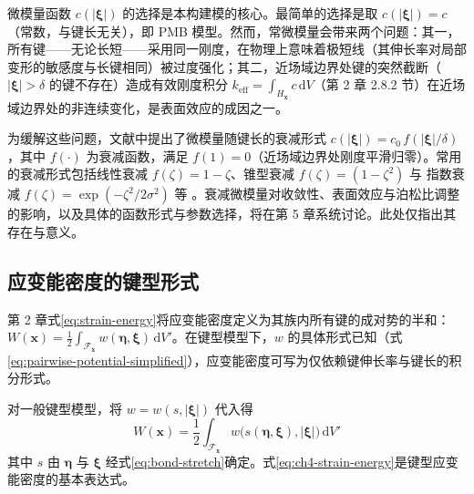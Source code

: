 微模量函数 $c(|\boldsymbol{\xi}|)$ 的选择是本构建模的核心。最简单的选择是取 $c(|\boldsymbol{\xi}|)=c$（常数，与键长无关），即 PMB 模型。然而，常微模量会带来两个问题：其一，所有键——无论长短——采用同一刚度，在物理上意味着极短线（其伸长率对局部变形的敏感度与长键相同）被过度强化；其二，近场域边界处键的突然截断（$|\boldsymbol{\xi}|>\delta$ 的键不存在）造成有效刚度积分 $k_{\mathrm{eff}}=\int_{H_{\mathbf{x}}}c\,\mathrm{d}V$（第 2 章 2.8.2 节）在近场域边界处的非连续变化，是表面效应的成因之一。

为缓解这些问题，文献中提出了微模量随键长的衰减形式 $c(|\boldsymbol{\xi}|)=c_0\,f(|\boldsymbol{\xi}|/\delta)$，其中 $f(\cdot)$ 为衰减函数，满足 $f(1)=0$（近场域边界处刚度平滑归零）。常用的衰减形式包括线性衰减 $f(\zeta)=1-\zeta$、锥型衰减 $f(\zeta)=(1-\zeta^{2})$ 与 指数衰减 $f(\zeta)=\exp(-\zeta^{2}/2\sigma^{2})$ 等 \cite{Bobaru2016,KilicMadenci2010}。衰减微模量对收敛性、表面效应与泊松比调整的影响，以及具体的函数形式与参数选择，将在第 5 章系统讨论。此处仅指出其存在与意义。

\subsection{应变能密度的键型形式}

第 2 章式\eqref{eq:strain-energy}将应变能密度定义为其族内所有键的成对势的半和：$W(\mathbf{x})=\tfrac{1}{2}\int_{\mathcal{F}_{\mathbf{x}}}w(\boldsymbol{\eta},\boldsymbol{\xi})\,\mathrm{d}V'$。在键型模型下，$w$ 的具体形式已知（式\eqref{eq:pairwise-potential-simplified}），应变能密度可写为仅依赖键伸长率与键长的积分形式。

对一般键型模型，将 $w=w(s,|\boldsymbol{\xi}|)$ 代入得
\begin{equation}
W(\mathbf{x}) = \frac{1}{2}\int_{\mathcal{F}_{\mathbf{x}}} w\bigl(s(\boldsymbol{\eta},\boldsymbol{\xi}),|\boldsymbol{\xi}|\bigr)\,\mathrm{d}V'
\label{eq:ch4-strain-energy}
\end{equation}
其中 $s$ 由 $\boldsymbol{\eta}$ 与 $\boldsymbol{\xi}$ 经式\eqref{eq:bond-stretch}确定。式\eqref{eq:ch4-strain-energy}是键型应变能密度的基本表达式。

